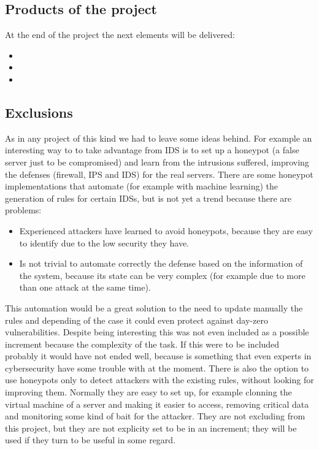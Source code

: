 \subsection{Products of the project}
At the end of the project the next elements will be delivered:
\begin{itemize}
	\item 
	\item 
	\item 
\end{itemize}

\subsection{Exclusions} 	%
As in any project of this kind we had to leave some ideas behind.
For example an interesting way to to take advantage from IDS is to set up a honeypot (a false server just to be compromised) and learn from the intrusions suffered, improving the defenses (firewall, IPS and IDS) for the real servers.
\linej
There are some honeypot implementations that automate (for example with machine learning) the generation of rules for certain IDSs, but is not yet a trend because there are problems\cite{snort_learning}\cite{honeypot_weka_learning}\cite{honeypot_ossec_trees}\cite{snort_honeypot}:
\begin{itemize}
	\item Experienced attackers have learned to avoid honeypots, because they are easy to identify due to the low security they have.
	\item Is not trivial to automate correctly the defense based on the information of the system, because its state can be very complex (for example due to more than one attack at the same time).
\end{itemize}
\linej
This automation would be a great solution to the need to update manually the rules and depending of the case it could even protect against day-zero vulnerabilities. Despite being interesting this was not even included as a possible increment because the complexity of the task.
If this were to be included probably it would have not ended well, because is something that even experts in cybersecurity have some trouble with at the moment.
\linej
There is also the option to use honeypots only to detect attackers with the existing rules, without looking for improving them. Normally they are easy to set up, for example clonning the virtual machine of a server and making it easier to access, removing critical data and monitoring some kind of bait for the attacker. They are not excluding from this project, but they are not explicity set to be in an increment; they will be used if they turn to be useful in some regard.
